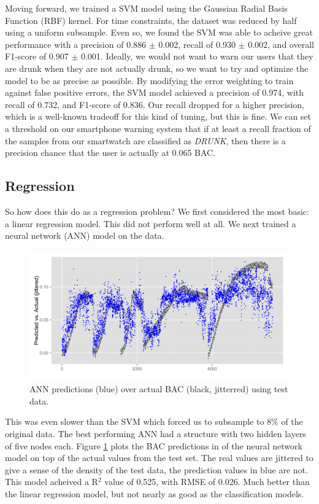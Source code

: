 Moving forward, we trained a SVM model using the Gaussian Radial Basis Function (RBF) kernel. For time constraints, the dataset was reduced by half using a uniform subsample. Even so, we found the SVM was able to acheive great performance with a precision of 0.886 $\pm$ 0.002, recall of 0.930 $\pm$ 0.002, and overall F1-score of 0.907 $\pm$ 0.001. Ideally, we would not want to warn our users that they are drunk when they are not actually drunk, so we want to try and optimize the model to be as precise as possible. By modifying the error weighting to train against false positive errors, the SVM model achieved a precision of 0.974, with recall of 0.732, and F1-score of 0.836. Our recall dropped for a higher precision, which is a well-known tradeoff for this kind of tuning, but this is fine. We can set a threshold on our smartphone warning system that if at least a recall fraction of the samples from our smartwatch are classified as \textit{DRUNK}, then there is a precision chance that the user is actually at 0.065 BAC.

\subsection{Regression}

So how does this do as a regression problem? We first considered the most basic: a linear regression model. This did not perform well at all. We next trained a neural network (ANN) model on the data. \begin{figure}
	\includegraphics[width=1.0\textwidth]{../figs/nn_all}
	\caption{ANN predictions (blue) over actual BAC (black, jitterred) using test data.}
	\label{fig:nn_all}
\end{figure}This was even slower than the SVM which forced us to subsample to 8\% of the original data. The best performing ANN had a structure with two hidden layers of five nodes each. Figure \ref{fig:nn_all} plots the BAC predictions in of the neural network model on top of the actual values from the test set. The real values are jittered to give a sense of the density of the test data, the prediction values in blue are not. This model acheived a R$^2$ value of 0.525, with RMSE of 0.026. Much better than the linear regression model, but not nearly as good as the classification models.